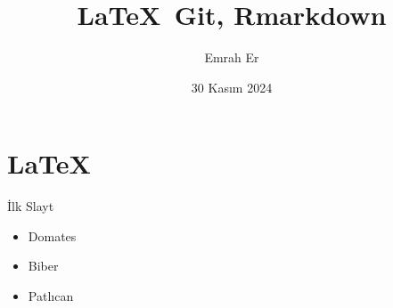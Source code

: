 \documentclass{beamer}
\title{\LaTeX{}\, Git, Rmarkdown}
\date{30 Kasım 2024}
\author{Emrah Er}
\institute{AÜSBF}
\begin{document}
  \maketitle

\section{\LaTeX{}}
  \begin{frame}{İlk Slayt}
    \begin{itemize}
      \item Domates
      \item Biber
      \item Patlıcan
    \end{itemize}
  \end{frame}
\end{document}
